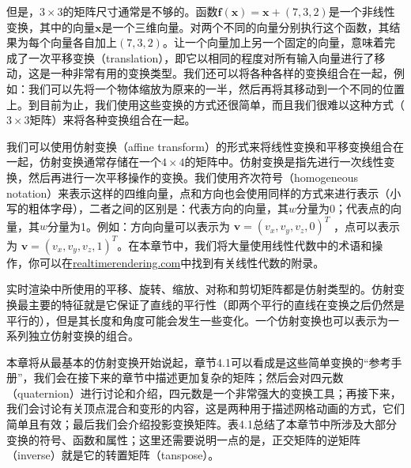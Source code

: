 \documentclass[
  paper=a4,
  ,captions=tableheading
]{scrartcl}
\begin{document}
但是，\(3 \times 3\)的矩阵尺寸通常是不够的。函数\(\mathbf{f(x)} = \mathbf{x} + (7,3,2)\)是一个非线性变换，其中的向量\(\mathbf{x}\)是一个三维向量。对两个不同的向量分别执行这个函数，其结果为每个向量各自加上\((7,3,2)\)。让一个向量加上另一个固定的向量，意味着完成了一次平移变换（translation），即它以相同的程度对所有输入向量进行了移动，这是一种非常有用的变换类型。我们还可以将各种各样的变换组合在一起，例如：我们可以先将一个物体缩放为原来的一半，然后再将其移动到一个不同的位置上。到目前为止，我们使用这些变换的方式还很简单，而且我们很难以这种方式（\(3 \times 3\)矩阵）来将各种变换组合在一起。

我们可以使用仿射变换（affine
transform）的形式来将线性变换和平移变换组合在一起，仿射变换通常存储在一个\(4 \times 4\)的矩阵中。仿射变换是指先进行一次线性变换，然后再进行一次平移操作的变换。我们使用齐次符号（homogeneous
notation）来表示这样的四维向量，点和方向也会使用同样的方式来进行表示（小写的粗体字母），二者之间的区别是：代表方向的向量，其\(w\)分量为0；代表点的向量，其\(w\)分量为1。例如：方向向量可以表示为
\(
  \mathbf{v} = (v_x,v_y,v_z,0)^{T}
\)
，点可以表示为
\(
  \mathbf{v} = (v_x,v_y,v_z,1)^{T}
\)。在本章节中，我们将大量使用线性代数中的术语和操作，你可以在\href{http://realtimerendering.com}{realtimerendering.com}中找到有关线性代数的附录。

实时渲染中所使用的平移、旋转、缩放、对称和剪切矩阵都是仿射类型的。仿射变换最主要的特征就是它保证了直线的平行性（即两个平行的直线在变换之后仍然是平行的），但是其长度和角度可能会发生一些变化。一个仿射变换也可以表示为一系列独立仿射变换的组合。

本章将从最基本的仿射变换开始说起，章节4.1可以看成是这些简单变换的``参考手册''，我们会在接下来的章节中描述更加复杂的矩阵；然后会对四元数（quaternion）进行讨论和介绍，四元数是一个非常强大的变换工具；再接下来，我们会讨论有关顶点混合和变形的内容，这是两种用于描述网格动画的方式，它们简单且有效；最后我们会介绍投影变换矩阵。表4.1总结了本章节中所涉及大部分变换的符号、函数和属性；这里还需要说明一点的是，正交矩阵的逆矩阵（inverse）就是它的转置矩阵（tanspose）。
\end{document}
